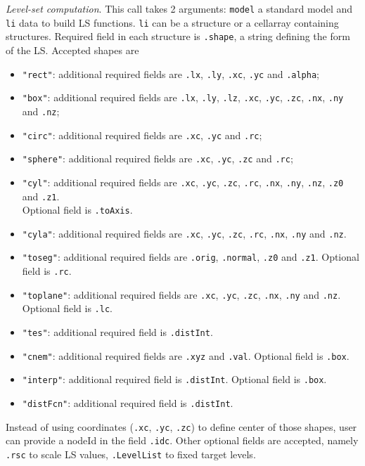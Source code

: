 {\sl Level-set computation}. This call takes 2 arguments: {\tt model} a standard model and {\tt li} data to build LS functions. {\tt li} can be  a structure or a cellarray containing structures. Required field in each structure is {\tt .shape}, a string defining the form of the LS. Accepted shapes are
\begin{itemize}
\item    {\tt  "rect"}: additional required fields are {\tt  .lx}, {\tt  .ly}, {\tt  .xc}, {\tt  .yc} and {\tt  .alpha};
\item    {\tt  "box"}: additional required fields are {\tt  .lx}, {\tt  .ly}, {\tt  .lz}, {\tt  .xc}, {\tt  .yc}, {\tt  .zc}, {\tt  .nx}, {\tt  .ny} and {\tt  .nz}; 
\item	{\tt  "circ"}: additional required fields are {\tt  .xc}, {\tt  .yc} and {\tt  .rc};
\item	{\tt  "sphere"}: additional required fields are {\tt  .xc}, {\tt  .yc}, {\tt  .zc} and {\tt  .rc}; 
\item	{\tt  "cyl"}: additional required fields are {\tt  .xc}, {\tt  .yc}, {\tt  .zc}, {\tt  .rc}, {\tt  .nx}, {\tt  .ny}, {\tt  .nz}, {\tt  .z0} and {\tt  .z1}.  \\Optional field is {\tt  .toAxis}.
\item	{\tt  "cyla"}: additional required fields are {\tt  .xc}, {\tt  .yc}, {\tt  .zc}, {\tt  .rc}, {\tt  .nx}, {\tt  .ny} and {\tt  .nz}.
\item	{\tt  "toseg"}: additional required fields are {\tt  .orig}, {\tt  .normal}, {\tt  .z0} and {\tt  .z1}. Optional field is {\tt  .rc}.
\item	{\tt  "toplane"}: additional required fields are {\tt  .xc}, {\tt  .yc}, {\tt  .zc}, {\tt  .nx}, {\tt  .ny} and {\tt  .nz}. \\Optional field is {\tt  .lc}.
\item	{\tt  "tes"}: additional required field is {\tt  .distInt}.
\item	{\tt  "cnem"}: additional required fields are {\tt  .xyz} and {\tt  .val}. Optional field is {\tt  .box}.
\item	{\tt  "interp"}: additional required field is {\tt  .distInt}. Optional field is {\tt  .box}.
\item	{\tt  "distFcn"}: additional required field is {\tt  .distInt}.
\end{itemize}
Instead of using coordinates ({\tt  .xc}, {\tt  .yc}, {\tt  .zc}) to define center of those shapes, user can provide a nodeId in the field {\tt  .idc}.
Other optional fields are accepted, namely {\tt  .rsc} to scale LS values, {\tt  .LevelList} to fixed target levels.


